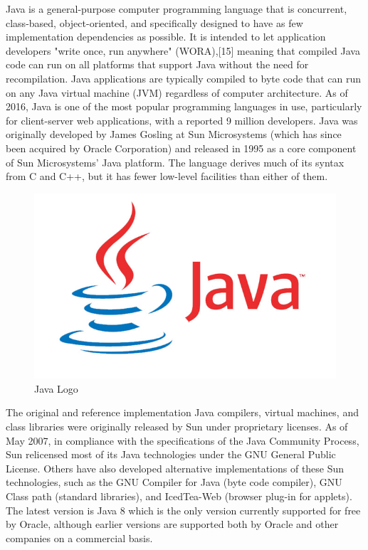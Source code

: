 Java is a general-purpose computer programming language that is concurrent, class-based, object-oriented, and specifically designed to have as few implementation dependencies as possible. It is intended to let application developers "write once, run anywhere" (WORA),[15] meaning that compiled Java code can run on all platforms that support Java without the need for recompilation. Java applications are typically compiled to byte code that can run on any Java virtual machine (JVM) regardless of computer architecture. As of 2016, Java is one of the most popular programming languages in use, particularly for client-server web applications, with a reported 9 million developers. Java was originally developed by James Gosling at Sun Microsystems (which has since been acquired by Oracle Corporation) and released in 1995 as a core component of Sun Microsystems' Java platform. The language derives much of its syntax from C and C++, but it has fewer low-level facilities than either of them.

\begin{figure}[ht]
\centering
\includegraphics[scale=0.5]{images/java.png}
\caption{Java Logo}
\end{figure}


The original and reference implementation Java compilers, virtual machines, and class libraries were originally released by Sun under proprietary licenses. As of May 2007, in compliance with the specifications of the Java Community Process, Sun relicensed most of its Java technologies under the GNU General Public License. Others have also developed alternative implementations of these Sun technologies, such as the GNU Compiler for Java (byte code compiler), GNU Class path (standard libraries), and IcedTea-Web (browser plug-in for applets).
The latest version is Java 8 which is the only version currently supported for free by Oracle, although earlier versions are supported both by Oracle and other companies on a commercial basis.


